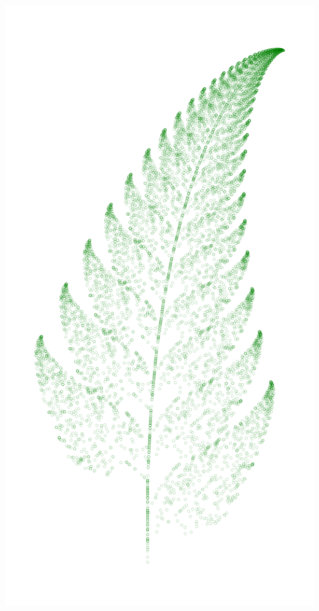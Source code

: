 \documentclass[usenames, dvipsnames, aspectratio=169]{beamer}
\begin{document}
{\begin{frame}[fragile]{}{}
    \hfill
    \includegraphics[height=.75\textheight]{barnsley_fern_2}%
    \hfill

\end{frame}}
\end{document}

